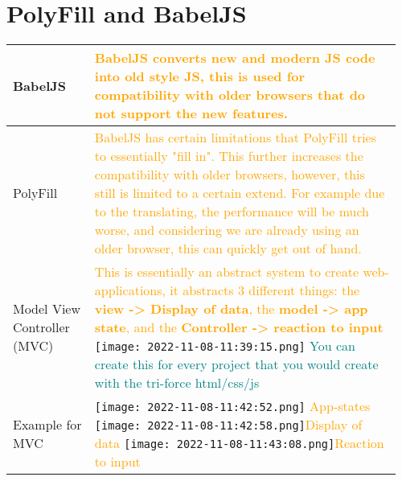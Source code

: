 \documentclass[main.tex,fontsize=8pt,paper=a4,paper=portrait,DIV=calc,]{scrartcl}
\begin{document}
\begin{table}[ht!]
\section{PolyFill and BabelJS}
\begin{tabular}{|m{0.2\linewidth}|m{0.755\linewidth}|}
\hline
BabelJS & 
\textcolor{orange}{BabelJS converts new and modern JS code into old style JS, this is used for compatibility with older browsers that do not support the new features.}\\
\hline
PolyFill &
\textcolor{orange}{BabelJS has certain limitations that PolyFill tries to essentially "fill in". This further increases the compatibility with older browsers, however, this still is limited to a certain extend.\newline
For example due to the translating, the performance will be much worse, and considering we are already using an older browser, this can quickly get out of hand.}\\
\hline
Model View Controller (MVC) & 
\textcolor{orange}{This is essentially an abstract system to create web-applications, it abstracts 3 different things: the \textbf{view -> Display of data}, the \textbf{model -> app state}, and the \textbf{Controller -> reaction to input}}\newline
\texttt{[image: 2022-11-08-11:39:15.png]}\newline
\textcolor{teal}{You can create this for every project that you would create with the tri-force html/css/js}\\
\hline
Example for MVC & 
\vspace{2mm}
\texttt{[image: 2022-11-08-11:42:52.png]} \textcolor{orange}{App-states}\newline
\texttt{[image: 2022-11-08-11:42:58.png]}\textcolor{orange}{Display of data}\newline
\texttt{[image: 2022-11-08-11:43:08.png]}\textcolor{orange}{Reaction to input}\\
\hline
\end{tabular}

\end{table}
\end{document}
